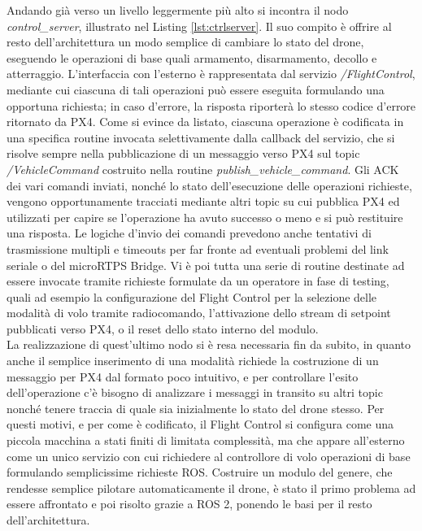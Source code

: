 Andando già verso un livello leggermente più alto si incontra il nodo \emph{control\_server}, illustrato nel Listing \ref{lst:ctrlserver}. Il suo compito è offrire al resto dell'architettura un modo semplice di cambiare lo stato del drone, eseguendo le operazioni di base quali armamento, disarmamento, decollo e atterraggio. L'interfaccia con l'esterno è rappresentata dal servizio \emph{/FlightControl}, mediante cui ciascuna di tali operazioni può essere eseguita formulando una opportuna richiesta; in caso d'errore, la risposta riporterà lo stesso codice d'errore ritornato da PX4. Come si evince da listato, ciascuna operazione è codificata in una specifica routine invocata selettivamente dalla callback del servizio, che si risolve sempre nella pubblicazione di un messaggio verso PX4 sul topic \emph{/VehicleCommand} costruito nella routine \emph{publish\_vehicle\_command}. Gli ACK dei vari comandi inviati, nonché lo stato dell'esecuzione delle operazioni richieste, vengono opportunamente tracciati mediante altri topic su cui pubblica PX4 ed utilizzati per capire se l'operazione ha avuto successo o meno e si può restituire una risposta. Le logiche d'invio dei comandi prevedono anche tentativi di trasmissione multipli e timeouts per far fronte ad eventuali problemi del link seriale o del microRTPS Bridge. Vi è poi tutta una serie di routine destinate ad essere invocate tramite richieste formulate da un operatore in fase di testing, quali ad esempio la configurazione del Flight Control per la selezione delle modalità di volo tramite radiocomando, l'attivazione dello stream di setpoint pubblicati verso PX4, o il reset dello stato interno del modulo.\\
La realizzazione di quest'ultimo nodo si è resa necessaria fin da subito, in quanto anche il semplice inserimento di una modalità richiede la costruzione di un messaggio per PX4 dal formato poco intuitivo, e per controllare l'esito dell'operazione c'è bisogno di analizzare i messaggi in transito su altri topic nonché tenere traccia di quale sia inizialmente lo stato del drone stesso. Per questi motivi, e per come è codificato, il Flight Control si configura come una piccola macchina a stati finiti di limitata complessità, ma che appare all'esterno come un unico servizio con cui richiedere al controllore di volo operazioni di base formulando semplicissime richieste ROS. Costruire un modulo del genere, che rendesse semplice pilotare automaticamente il drone, è stato il primo problema ad essere affrontato e poi risolto grazie a ROS 2, ponendo le basi per il resto dell'architettura.\\
